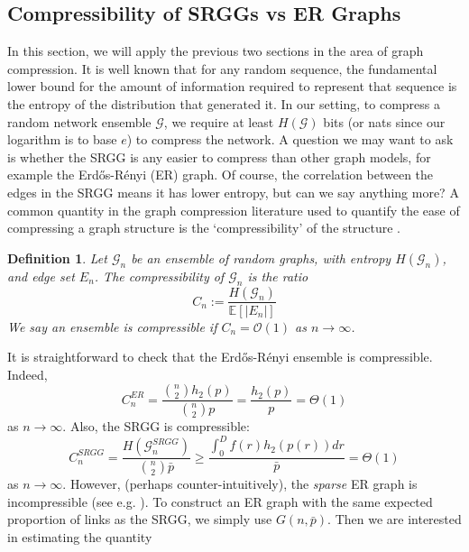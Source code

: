 \documentclass{article}
\newtheorem{definition}{Definition}
\newcommand{\tti}{\rightarrow\infty}
\newcommand{\graph}{\mathcal{G}}
\newcommand{\bigO}[1]{\mathcal{O}\left(#1\right)}
\begin{document}
    \subsection{Compressibility of SRGGs vs ER Graphs}
    In this section, we will apply the previous two sections in the area of graph compression. It is well known that for any random sequence, the fundamental lower bound for the amount of information required to represent that sequence is the entropy of the distribution that generated it. In our setting, to compress a random network ensemble $\graph$, we require at least $H(\graph)$ bits (or nats since our logarithm is to base $e$) to compress the network. A question we may want to ask is whether the SRGG is any easier to compress than other graph models, for example the Erd\H os-R\'enyi (ER) graph. Of course, the correlation between the edges in the SRGG means it has lower entropy, but can we say anything more? A common quantity in the graph compression literature used to quantify the ease of compressing a graph structure is the `compressibility' of the structure \cite{chierichetti2009models, kontoyiannis2022compression}. 
    \begin{definition}
        Let $\graph_n$ be an ensemble of random graphs, with entropy $H(\graph_n)$, and edge set $E_n$. The compressibility of $\graph_n$ is the ratio
        \begin{equation}
            C_n := \frac{H(\graph_n)}{\mathbb{E}[|E_n|]}
        \end{equation}
        We say an ensemble is compressible if $C_n = \bigO{1}$ as $n\tti$.
    \end{definition}
    It is straightforward to check that the Erd\H os-R\'enyi ensemble is compressible. Indeed,
    \begin{equation}
        C_n^{ER} = \frac{\binom{n}{2}h_2(p)}{\binom{n}{2}p} = \frac{h_2(p)}{p} = \Theta(1)
    \end{equation}
    as $n\tti$. Also, the SRGG is compressible:
    \begin{equation}
        \label{eq:cnsrgg_lb}
        C_n^{SRGG} = \frac{H(\graph_n^{SRGG})}{\binom{n}{2}\bar{p}} \geq \frac{\int_0^D f(r)h_2(p(r))dr}{\bar{p}} = \Theta(1)
    \end{equation}
     as $n\tti$. However, (perhaps counter-intuitively), the \textit{sparse} ER graph is incompressible (see e.g. \cite{kontoyiannis2022compression}). To construct an ER graph with the same expected proportion of links as the SRGG, we simply use $G(n,\bar{p})$. Then we are interested in estimating the quantity
\end{document}
